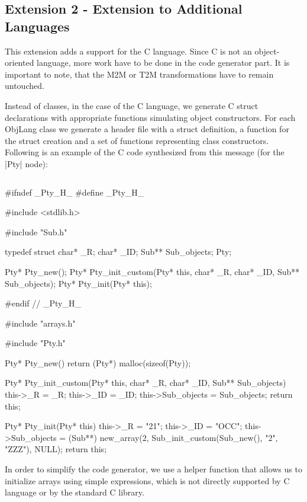 \subsection{Extension 2 - Extension to Additional Languages}
\label{sec:Extension2}

This extension adds a support for the C language.
Since C is not an object-oriented language, more work have to be done in the code generator part.
It is important to note, that the M2M or T2M transformations have to remain untouched.

Instead of classes, in the case of the C language, we generate C struct declarations with appropriate functions simulating object constructors.
For each ObjLang class we generate a header file with a struct definition, a function for the struct creation and a set of functions representing class constructors.
Following is an example of the C code synthesized from this \FIXML message (for the \Scala|Pty| node):
%
\inputminted[fontsize=\fontsize{8}{8},linenos,numbersep=5pt,frame=lines,framesep=2mm]{xml}{listings/example-for-c-code.xml}
%
\begin{ccode}
#ifndef _Pty_H_
#define _Pty_H_

#include <stdlib.h>

#include "Sub.h"

typedef struct {
  char* _R;
  char* _ID;
  Sub** Sub_objects;
} Pty;

Pty* Pty_new();
Pty* Pty_init_custom(Pty* this, char* _R, char* _ID, Sub** Sub_objects);
Pty* Pty_init(Pty* this);

#endif // _Pty_H_	
\end{ccode}
%
\begin{ccode}
#include "arrays.h"

#include "Pty.h"

Pty* Pty_new() {
  return (Pty*) malloc(sizeof(Pty));
}

Pty* Pty_init_custom(Pty* this, char* _R, char* _ID, Sub** Sub_objects) {
  this->_R = _R;
  this->_ID = _ID;
  this->Sub_objects = Sub_objects;
  return this;
}

Pty* Pty_init(Pty* this) {
  this->_R = "21";
  this->_ID = "OCC";
  this->Sub_objects = (Sub**) new_array(2, Sub_init_custom(Sub_new(), "2", "ZZZ"), NULL);
  return this;
}
\end{ccode}

In order to simplify the code generator, we use a helper function  that allows us to initialize arrays using simple expressions, which is not directly supported by C language or by the standard C library.

